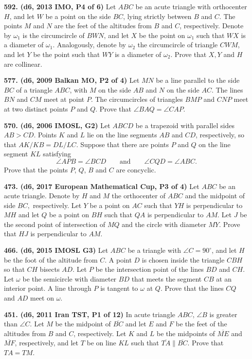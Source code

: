 \documentclass{article}
\begin{document}
\textbf{592. (\color{red}d6\color{black}, 2013 IMO, P4 of 6)} Let $ABC$ be an acute triangle with orthocenter $H$, and let $W$ be a point on the side $BC$, lying strictly between $B$ and $C$. The points $M$ and $N$ are the feet of the altitudes from $B$ and $C$, respectively. Denote by $\omega_1$ is the circumcircle of $BWN$, and let $X$ be the point on $\omega_1$ such that $WX$ is a diameter of $\omega_1$. Analogously, denote by $\omega_2$ the circumcircle of triangle $CWM$, and let $Y$ be the point such that $WY$ is a diameter of $\omega_2$. Prove that $X,Y$ and $H$ are collinear.

\textbf{577. (\color{red}d6\color{black}, 2009 Balkan MO, P2 of 4)} Let $ MN$ be a line parallel to the side $ BC$ of a triangle $ ABC$, with $ M$ on the side $ AB$ and $ N$ on the side $ AC$. The lines $ BN$ and $ CM$ meet at point $ P$. The circumcircles of triangles $ BMP$ and $ CNP$ meet at two distinct points $ P$ and $ Q$. Prove that $ \angle BAQ = \angle CAP$.

\textbf{570. (\color{red}d6\color{black}, 2006 IMOSL, G2)} Let $ ABCD$ be a trapezoid with parallel sides $ AB > CD$. Points $ K$ and $ L$ lie on the line segments $ AB$ and $ CD$, respectively, so that $AK/KB=DL/LC$. Suppose that there are points $ P$ and $ Q$ on the line segment $ KL$ satisfying \[\angle{APB} = \angle{BCD}\qquad\text{and}\qquad \angle{CQD} = \angle{ABC}.\]Prove that the points $ P$, $ Q$, $ B$ and $ C$ are concyclic.

\textbf{473. (\color{red}d6\color{black}, 2017 European Mathematical Cup, P3 of 4)} Let $ABC$ be an acute triangle. Denote by $H$ and $M$ the orthocenter of $ABC$ and the midpoint
of side $BC,$ respectively. Let $Y$ be a point on $AC$ such that $YH$ is perpendicular to $MH$ and let $Q$ be a point
on $BH$ such that $QA$ is perpendicular to $AM.$ Let $J$ be the second point of intersection of $MQ$ and the circle
with diameter $MY.$ Prove that $HJ$ is perpendicular to $AM.$

\textbf{466. (\color{red}d6\color{black}, 2015 IMOSL G3)} Let $ABC$ be a triangle with $\angle{C} = 90^{\circ}$, and let $H$ be the foot of the altitude from $C$. A point $D$ is chosen inside the triangle $CBH$ so that $CH$ bisects $AD$. Let $P$ be the intersection point of the lines $BD$ and $CH$. Let $\omega$ be the semicircle with diameter $BD$ that meets the segment $CB$ at an interior point. A line through $P$ is tangent to $\omega$ at $Q$. Prove that the lines $CQ$ and $AD$ meet on $\omega$.

\textbf{451. (\color{red}d6\color{black}, 2011 Iran TST, P1 of 12)} In acute triangle $ABC$, $\angle B$ is greater than $\angle C$. Let $M$ be the midpoint of $\overline{BC}$ and let $E$ and $F$ be the feet of the altitudes from $B$ and $C$, respectively. Let $K$ and $L$ be the midpoints of $\overline{ME}$ and $\overline{MF}$, respectively, and let $T$ be on line $KL$ such that $\overline{TA} \parallel \overline{BC}$. Prove that $TA = TM$.
\end{document}
